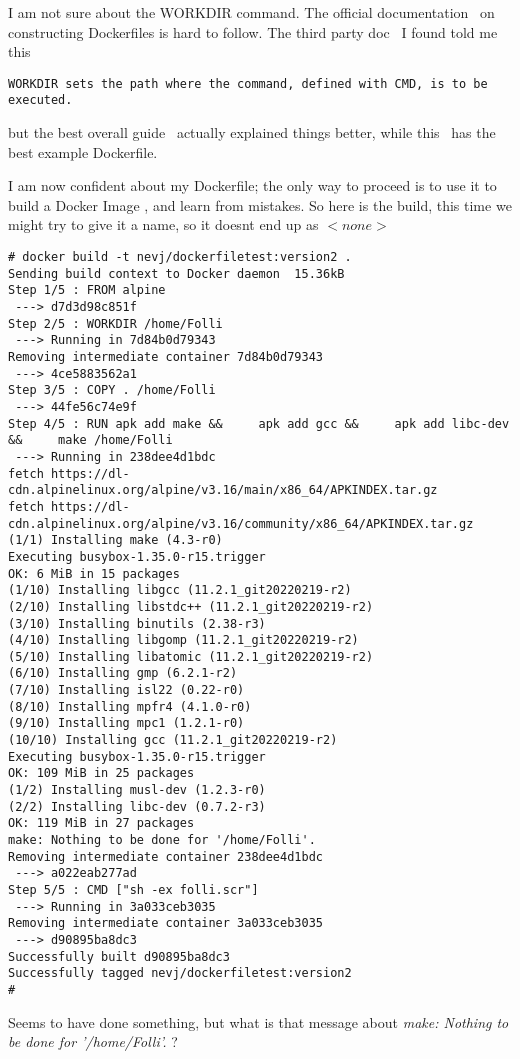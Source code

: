 \documentclass{article}  %
\begin{document}
I am not sure about the WORKDIR command. The official  documentation~\cite{dock:07} on constructing Dockerfiles is hard to follow. The third party doc~\cite{dock:05} I found told me this
\begin{verbatim}
WORKDIR sets the path where the command, defined with CMD, is to be executed.
\end{verbatim}
but the best  overall guide~\cite{dock:06} actually explained things better, while  this~\cite{dock:09} has the best example Dockerfile.

I am now confident about my Dockerfile; the only way to proceed is to use it to build a Docker Image , and learn from mistakes. So here is the build, this time we might try to give it a name, so it doesnt end up as $<none>$
\begin{verbatim}
# docker build -t nevj/dockerfiletest:version2 .
Sending build context to Docker daemon  15.36kB
Step 1/5 : FROM alpine
 ---> d7d3d98c851f
Step 2/5 : WORKDIR /home/Folli
 ---> Running in 7d84b0d79343
Removing intermediate container 7d84b0d79343
 ---> 4ce5883562a1
Step 3/5 : COPY . /home/Folli
 ---> 44fe56c74e9f
Step 4/5 : RUN apk add make &&     apk add gcc &&     apk add libc-dev &&     make /home/Folli
 ---> Running in 238dee4d1bdc
fetch https://dl-cdn.alpinelinux.org/alpine/v3.16/main/x86_64/APKINDEX.tar.gz
fetch https://dl-cdn.alpinelinux.org/alpine/v3.16/community/x86_64/APKINDEX.tar.gz
(1/1) Installing make (4.3-r0)
Executing busybox-1.35.0-r15.trigger
OK: 6 MiB in 15 packages
(1/10) Installing libgcc (11.2.1_git20220219-r2)
(2/10) Installing libstdc++ (11.2.1_git20220219-r2)
(3/10) Installing binutils (2.38-r3)
(4/10) Installing libgomp (11.2.1_git20220219-r2)
(5/10) Installing libatomic (11.2.1_git20220219-r2)
(6/10) Installing gmp (6.2.1-r2)
(7/10) Installing isl22 (0.22-r0)
(8/10) Installing mpfr4 (4.1.0-r0)
(9/10) Installing mpc1 (1.2.1-r0)
(10/10) Installing gcc (11.2.1_git20220219-r2)
Executing busybox-1.35.0-r15.trigger
OK: 109 MiB in 25 packages
(1/2) Installing musl-dev (1.2.3-r0)
(2/2) Installing libc-dev (0.7.2-r3)
OK: 119 MiB in 27 packages
make: Nothing to be done for '/home/Folli'.
Removing intermediate container 238dee4d1bdc
 ---> a022eab277ad
Step 5/5 : CMD ["sh -ex folli.scr"]
 ---> Running in 3a033ceb3035
Removing intermediate container 3a033ceb3035
 ---> d90895ba8dc3
Successfully built d90895ba8dc3
Successfully tagged nevj/dockerfiletest:version2
# 
\end{verbatim}
 Seems to have done something, but what is that message about {\em make: Nothing to be done for '/home/Folli'.} ?
 
\end{document}
